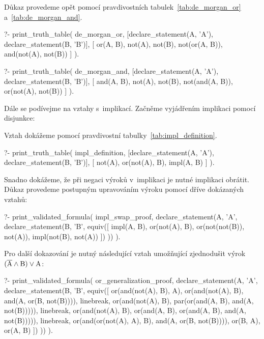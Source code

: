 
Důkaz provedeme opět pomocí pravdivostních tabulek~\ref{tab:de_morgan_or} a~\ref{tab:de_morgan_and}.

\begin{prolog}
?- print_truth_table(
	de_morgan_or,
	[declare_statement(A, 'A'), declare_statement(B, 'B')],
	[
		or(A, B),
		not(A),
		not(B),
		not(or(A, B)),
		and(not(A), not(B))
	]
).
\end{prolog}

\begin{prolog}
?- print_truth_table(
	de_morgan_and,
	[declare_statement(A, 'A'), declare_statement(B, 'B')],
	[
		and(A, B),
		not(A),
		not(B),
		not(and(A, B)),
		or(not(A), not(B))
	]
).
\end{prolog}

Dále se podívejme na vztahy s~implikací. Začněme vyjádřením implikaci pomocí disjunkce:


Vztah dokážeme pomocí pravdivostní tabulky~\ref{tab:impl_definition}.

\begin{prolog}
?- print_truth_table(
	impl_definition,
	[declare_statement(A, 'A'), declare_statement(B, 'B')],
	[
		not(A),
		or(not(A), B),
		impl(A, B)
	]
).
\end{prolog}

Snadno dokážeme, že při negaci výroků v~implikaci je nutné implikaci obrátit. Důkaz provedeme postupným upravováním výroku pomocí dříve dokázaných vztahů:

\begin{prolog}
?- print_validated_formula(
	impl_swap_proof,
	declare_statement(A, 'A', declare_statement(B, 'B',
		equiv([
			impl(A, B),
			or(not(A), B),
			or(not(not(B)), not(A)),
			impl(not(B), not(A))
		])
	))
).
\end{prolog}

Pro další dokazování je nutný následující vztah umožňující zjednodušit výrok \((\overline{\mathrm{A}} \land \mathrm{B}) \lor \mathrm{A}\):

\begin{prolog}
?- print_validated_formula(
	or_generalization_proof,
	declare_statement(A, 'A', declare_statement(B, 'B',
		equiv([
			or(and(not(A), B), A),
			or(and(not(A), B), and(A, or(B, not(B)))),
			linebreak,
			or(and(not(A), B), par(or(and(A, B), and(A, not(B))))),
			linebreak,
			or(and(not(A), B), or(and(A, B), or(and(A, B), and(A, not(B))))),
			linebreak,
			or(and(or(not(A), A), B), and(A, or(B, not(B)))),
			or(B, A),
			or(A, B)
		])
	))
).
\end{prolog}

